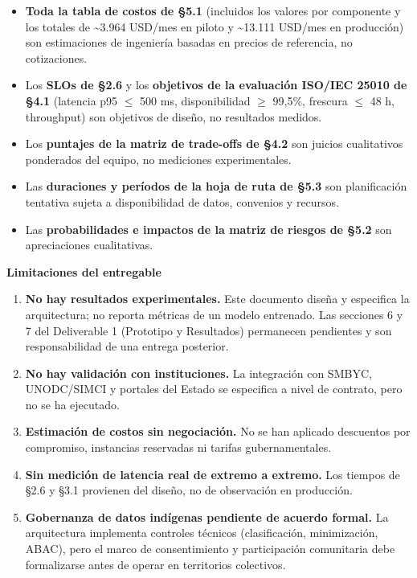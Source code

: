 \documentclass{article}
\newcommand{\mdhfour}[1]{\par\medskip\noindent\textbf{#1}\par\nobreak\smallskip}
\begin{document}
\begin{itemize}
  \item \textbf{Toda la tabla de costos de \S{}5.1} (incluidos los valores por componente y los totales de \textasciitilde{}3.964 USD/mes en piloto y \textasciitilde{}13.111 USD/mes en producción) son estimaciones de ingeniería basadas en precios de referencia, no cotizaciones.
  \item Los \textbf{SLOs de \S{}2.6} y los \textbf{objetivos de la evaluación ISO/IEC 25010 de \S{}4.1} (latencia p95 \ensuremath{\leq} 500 ms, disponibilidad \ensuremath{\geq} 99,5\%, frescura \ensuremath{\leq} 48 h, throughput) son objetivos de diseño, no resultados medidos.
  \item Los \textbf{puntajes de la matriz de trade-offs de \S{}4.2} son juicios cualitativos ponderados del equipo, no mediciones experimentales.
  \item Las \textbf{duraciones y períodos de la hoja de ruta de \S{}5.3} son planificación tentativa sujeta a disponibilidad de datos, convenios y recursos.
  \item Las \textbf{probabilidades e impactos de la matriz de riesgos de \S{}5.2} son apreciaciones cualitativas.
\end{itemize}

\mdhfour{Limitaciones del entregable}

\begin{enumerate}
  \item \textbf{No hay resultados experimentales.} Este documento diseña y especifica la arquitectura; no reporta métricas de un modelo entrenado. Las secciones 6 y 7 del Deliverable 1 (Prototipo y Resultados) permanecen pendientes y son responsabilidad de una entrega posterior.
  \item \textbf{No hay validación con instituciones.} La integración con SMBYC, UNODC/SIMCI y portales del Estado se especifica a nivel de contrato, pero no se ha ejecutado.
  \item \textbf{Estimación de costos sin negociación.} No se han aplicado descuentos por compromiso, instancias reservadas ni tarifas gubernamentales.
  \item \textbf{Sin medición de latencia real de extremo a extremo.} Los tiempos de \S{}2.6 y \S{}3.1 provienen del diseño, no de observación en producción.
  \item \textbf{Gobernanza de datos indígenas pendiente de acuerdo formal.} La arquitectura implementa controles técnicos (clasificación, minimización, ABAC), pero el marco de consentimiento y participación comunitaria debe formalizarse antes de operar en territorios colectivos.
\end{enumerate}
\end{document}
